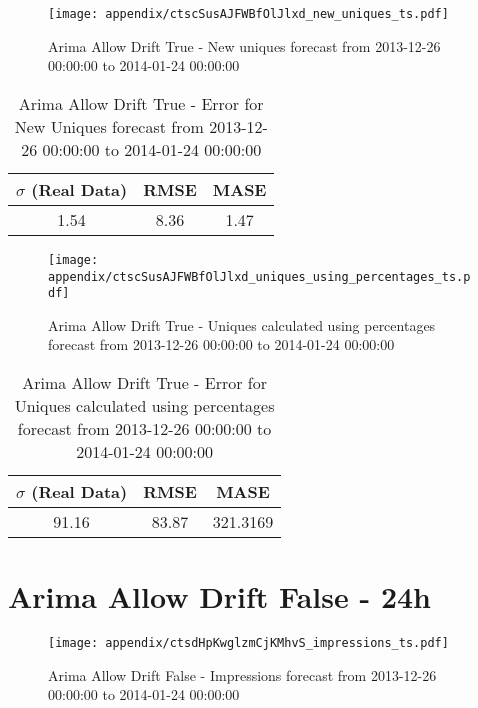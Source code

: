 \begin{figure}[H] \begin{center} \leavevmode
\texttt{[image: appendix/ctscSusAJFWBfOlJlxd\_new\_uniques\_ts.pdf]} \caption{
Arima Allow Drift True - New uniques forecast from 2013-12-26 00:00:00 to 2014-01-24 00:00:00} \label{fig:appendix/ctscSusAJFWBfOlJlxd_new_uniques_ts.pdf} \end{center}
\end{figure}

\begin{table}[H]
\centering
\footnotesize
\begin{tabular}{ccc}
$\sigma$ (Real Data) & RMSE & MASE   \\ \hline
1.54 & 8.36 & 1.47 \\
\end{tabular}

\vspace{0.5cm}

\caption{
Arima Allow Drift True - Error for New Uniques forecast from 2013-12-26 00:00:00 to 2014-01-24 00:00:00}
\end{table}

\begin{figure}[H] \begin{center} \leavevmode
\texttt{[image: appendix/ctscSusAJFWBfOlJlxd\_uniques\_using\_percentages\_ts.pdf]} \caption{
Arima Allow Drift True - Uniques calculated using percentages forecast from 2013-12-26 00:00:00 to 2014-01-24 00:00:00} \label{fig:appendix/ctscSusAJFWBfOlJlxd_uniques_using_percentages_ts.pdf} \end{center}
\end{figure}

\begin{table}[H]
\centering
\footnotesize
\begin{tabular}{ccc}
$\sigma$ (Real Data) & RMSE & MASE   \\ \hline
91.16 & 83.87 & 321.3169 \\
\end{tabular}

\vspace{0.5cm}

\caption{
Arima Allow Drift True - Error for Uniques calculated using percentages forecast from 2013-12-26 00:00:00 to 2014-01-24 00:00:00}
\end{table}

\section{Arima Allow Drift False - 24h}
\begin{figure}[H] \begin{center} \leavevmode
\texttt{[image: appendix/ctsdHpKwglzmCjKMhvS\_impressions\_ts.pdf]} \caption{
Arima Allow Drift False - Impressions forecast from 2013-12-26 00:00:00 to 2014-01-24 00:00:00} \label{fig:appendix/ctsdHpKwglzmCjKMhvS_impressions_ts.pdf} \end{center}
\end{figure}

